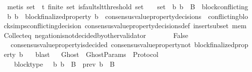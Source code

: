 \begin{isabellebody}
\ {\isacharparenleft}metis\ {\isacartoucheopen}{\isasymsigma}{\isacharunderscore}set\ {\isasymsubseteq}\ {\isasymSigma}t{\isacartoucheclose}\ {\isacartoucheopen}finite\ {\isasymsigma}{\isacharunderscore}set{\isacartoucheclose}\ {\isacartoucheopen}is{\isacharunderscore}faults{\isacharunderscore}lt{\isacharunderscore}threshold\ {\isacharparenleft}{\isasymUnion}{\isasymsigma}{\isacharunderscore}set{\isacharparenright}{\isacartoucheclose}\ {\isacartoucheopen}{\isacharbraceleft}{\isasymsigma}{\isacharcomma}\ {\isasymsigma}{\isacharprime}{\isacharbraceright}\ {\isasymsubseteq}\ {\isasymsigma}{\isacharunderscore}set\ {\isasymand}\ {\isacharbraceleft}b{}{\isacharcomma}\ b{}{\isacharbraceright}\ {\isasymsubseteq}\ B\ {\isasymand}\ block{\isacharunderscore}conflicting\ {\isacharparenleft}b{}{\isacharcomma}\ b{}{\isacharparenright}\ {\isasymand}\ block{\isacharunderscore}finalized{\isacharunderscore}property\ b{}\ {\isasymin}\ consensus{\isacharunderscore}value{\isacharunderscore}property{\isacharunderscore}decisions\ {\isasymsigma}{\isacartoucheclose}\ conflicting{\isacharunderscore}blocks{\isacharunderscore}imps{\isacharunderscore}conflicting{\isacharunderscore}decision\ consensus{\isacharunderscore}value{\isacharunderscore}property{\isacharunderscore}decisions{\isacharunderscore}def\ insert{\isacharunderscore}subset\ mem{\isacharunderscore}Collect{\isacharunderscore}eq\ negation{\isacharunderscore}is{\isacharunderscore}not{\isacharunderscore}decided{\isacharunderscore}by{\isacharunderscore}other{\isacharunderscore}validator{\isacharparenright}\ \isanewline
\ \ \ \isamarkupfalse%
\ \isamarkupfalse%
\ False\isanewline
\ \ \ \ \ \isamarkupfalse%
\ {\isacartoucheopen}{\isasymnot}\ consensus{\isacharunderscore}value{\isacharunderscore}property{\isacharunderscore}is{\isacharunderscore}decided\ {\isacharparenleft}consensus{\isacharunderscore}value{\isacharunderscore}property{\isacharunderscore}not\ {\isacharparenleft}block{\isacharunderscore}finalized{\isacharunderscore}property\ b{}{\isacharparenright}{\isacharcomma}\ {\isasymsigma}{\isacharprime}{\isacharparenright}{\isacartoucheclose}\ \isamarkupfalse%
\ blast\isanewline
\ \isamarkupfalse%
%
\endisatagproof
{\isafoldproof}%
%
\isadelimproof
\isanewline
%
\endisadelimproof
\isanewline
\isanewline
{}\isamarkupfalse%
\ Ghost\ {\isacharequal}\ GhostParams\ {\isacharplus}\ Protocol\ {\isacharplus}\isanewline
\ \ \ block{\isacharunderscore}type\ {\isacharcolon}\ {\isachardoublequoteopen}{\isasymforall}\ b{\isachardot}\ b\ {\isasymin}\ B\ {\isasymlongleftrightarrow}\ prev\ b\ {\isasymin}\ B{\isachardoublequoteclose}\isanewline

\end{isabellebody}
